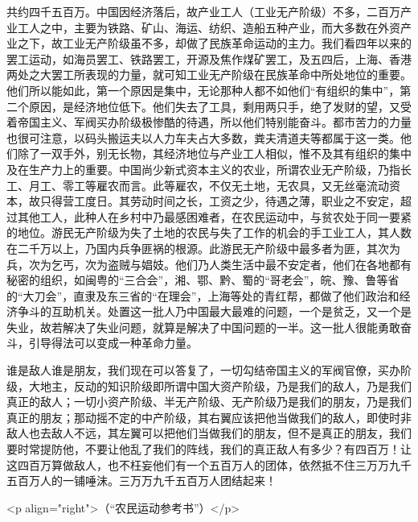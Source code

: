 共约四千五百万。中国因经济落后，故产业工人（工业无产阶级）不多，二百万产业工人之中，主要为铁路、矿山、海运、纺织、造船五种产业，而大多数在外资产业之下，故工业无产阶级虽不多，却做了民族革命运动的主力。我们看四年以来的罢工运动，如海员罢工、铁路罢工，开源及焦作煤矿罢工，及五四后，上海、香港两处之大罢工所表现的力量，就可知工业无产阶级在民族革命中所处地位的重要。他们所以能如此，第一个原因是集中，无论那种人都不如他们“有组织的集中”，第二个原因，是经济地位低下。他们失去了工具，剩用两只手，绝了发财的望，又受着帝国主义、军阀买办阶级极惨酷的待遇，所以他们特别能奋斗。都市苦力的力量也很可注意，以码头搬运夫以人力车夫占大多数，粪夫清道夫等都属于这一类。他们除了一双手外，别无长物，其经济地位与产业工人相似，惟不及其有组织的集中及在生产力上的重要。中国尚少新式资本主义的农业，所谓农业无产阶级，乃指长工、月工、零工等雇农而言。此等雇农，不仅无土地，无农具，又无丝毫流动资本，故只得营工度日。其劳动时间之长，工资之少，待遇之薄，职业之不安定，超过其他工人，此种人在乡村中乃最感困难者，在农民运动中，与贫农处于同一要紧的地位。游民无产阶级为失了土地的农民与失了工作的机会的手工业工人，其人数在二千万以上，乃国内兵争匪祸的根源。此游民无产阶级中最多者为匪，其次为兵，次为乞丐，次为盗贼与娼妓。他们乃人类生活中最不安定者，他们在各地都有秘密的组织，如闽粤的“三合会”，湘、鄂、黔、蜀的“哥老会”，皖、豫、鲁等省的“大刀会”，直隶及东三省的“在理会”，上海等处的青红帮，都做了他们政治和经济争斗的互助机关。处置这一批人乃中国最大最难的问题，一个是贫乏，又一个是失业，故若解决了失业问题，就算是解决了中国问题的一半。这一批人很能勇敢奋斗，引导得法可以变成一种革命力量。

谁是敌人谁是朋友，我们现在可以答复了，一切勾结帝国主义的军阀官僚，买办阶级，大地主，反动的知识阶级即所谓中国大资产阶级，乃是我们的敌人，乃是我们真正的敌人；一切小资产阶级、半无产阶级、无产阶级乃是我们的朋友，乃是我们真正的朋友；那动摇不定的中产阶级，其右翼应该把他当做我们的敌人，即使时非敌人也去敌人不远，其左翼可以把他们当做我们的朋友，但不是真正的朋友，我们要时常提防他，不要让他乱了我们的阵线，我们的真正敌人有多少？有四百万！让这四百万算做敌人，也不枉妄他们有一个五百万人的团体，依然抵不住三万万九千五百万人的一铺唾沫。三万万九千五百万人团结起来！

<p align="right">（“农民运动参考书”）</p>

